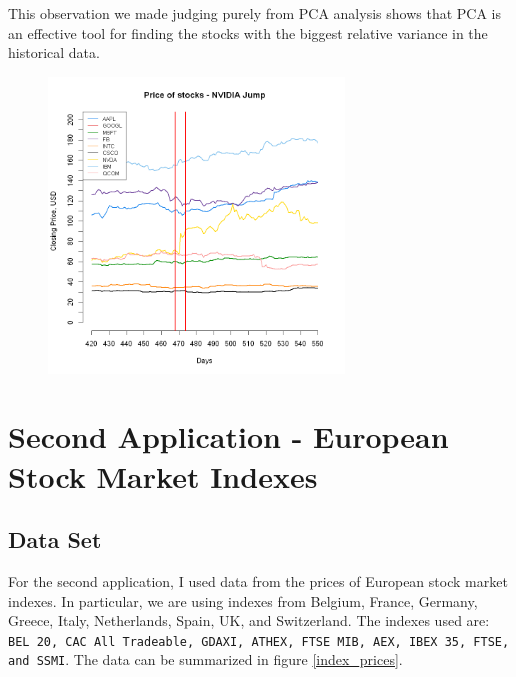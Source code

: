 \documentclass{article}
\begin{document}
This observation we made judging purely from PCA analysis shows that PCA is an effective tool for finding the stocks with the biggest relative variance in the historical data. 

\begin{figure}[h]
    \caption{}
    \centering
    \includegraphics[width=0.7\textwidth]{nvidia_jump.png}
\end{figure}


\pagebreak
\section{Second Application - European Stock Market Indexes}

\subsection{Data Set}

For the second application, I used data from the prices of European stock market indexes. In particular, we are using  indexes from Belgium, France, Germany, Greece, Italy, Netherlands, Spain, UK, and Switzerland. The indexes used are: \texttt{BEL 20, CAC All Tradeable, GDAXI, ATHEX, FTSE MIB, AEX, IBEX 35, FTSE, and SSMI}. The data can be summarized in figure \ref{index_prices}.
\end{document}
